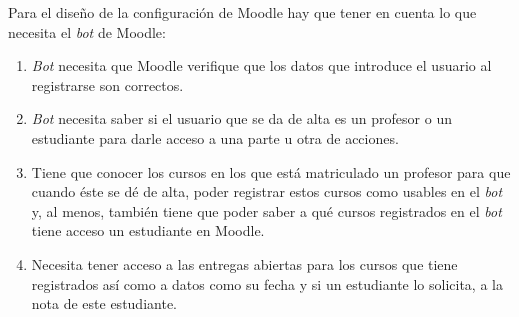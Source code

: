 Para el diseño de la configuración de Moodle hay que tener en cuenta lo que necesita el \textit{bot} de Moodle:
\begin{enumerate} 
\item \textit{Bot} necesita que Moodle verifique que los datos que introduce el usuario al registrarse son correctos.
\item \textit{Bot} necesita saber si el usuario que se da de alta es un profesor o un estudiante para darle acceso a una parte u otra de acciones.
\item Tiene que conocer los cursos en los que está matriculado un profesor para que cuando éste se dé de alta, poder registrar estos cursos como usables en el \textit{bot} y, al menos, también tiene que poder saber a qué cursos registrados en el \textit{bot} tiene acceso un estudiante en Moodle.
\item Necesita tener acceso a las entregas abiertas para los cursos que tiene registrados así como a datos como su fecha y si un estudiante lo solicita, a la nota de este estudiante.

\end{enumerate}

